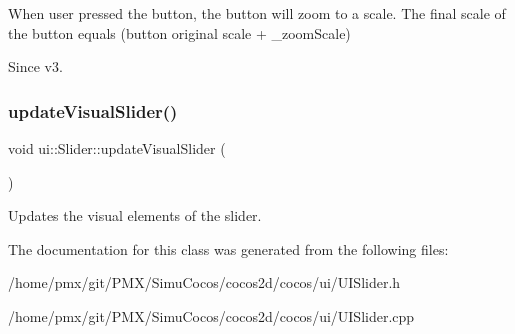 When user pressed the button, the button will zoom to a scale. The final scale of the button equals (button original scale + \+\_\+zoom\+Scale) \begin{DoxySince}{Since}
v3. 
\end{DoxySince}
\mbox{\label{classui_1_1Slider_ace01b8797b23ae588f6f461da5cc667a}} 
\subsubsection{\texorpdfstring{update\+Visual\+Slider()}{updateVisualSlider()}}
{\footnotesize\ttfamily void ui\+::\+Slider\+::update\+Visual\+Slider (\begin{DoxyParamCaption}{ }\end{DoxyParamCaption})}

Updates the visual elements of the slider. 

The documentation for this class was generated from the following files\+:\begin{DoxyCompactItemize}
\item 
/home/pmx/git/\+P\+M\+X/\+Simu\+Cocos/cocos2d/cocos/ui/U\+I\+Slider.\+h\item 
/home/pmx/git/\+P\+M\+X/\+Simu\+Cocos/cocos2d/cocos/ui/U\+I\+Slider.\+cpp\end{DoxyCompactItemize}

